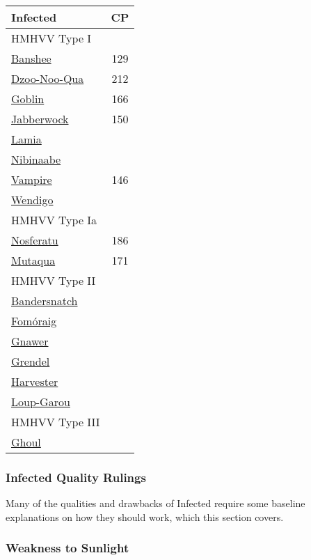 \begin{multicols*}{3}
	
	\begin{center}
		\begin{tabularx}{0.32\textwidth}{|X|c|}
			\hline
			Infected & CP \\
			\hline
			\hline
			HMHVV Type I & \\
			\hline
			\hyperref[banshee]{Banshee} & 129 \\
			\hyperref[dzoo-noo-qua]{Dzoo-Noo-Qua} & 212 \\
			\hyperref[goblin]{Goblin} & 166 \\
			\hyperref[jabberwock]{Jabberwock} & 150 \\
			\hyperref[lamia]{Lamia} & \\
			\hyperref[nibinaabe]{Nibinaabe} & \\
			\hyperref[vampire]{Vampire} & 146 \\
			\hyperref[wendigo]{Wendigo} & \\
			\hline
			\hline
			HMHVV Type Ia & \\
			\hline
			\hyperref[nosferatu]{Nosferatu} & 186 \\
			\hyperref[mutaqua]{Mutaqua} & 171 \\
			\hline
			\hline
			HMHVV Type II & \\
			\hline
			\hyperref[bandersnatch]{Bandersnatch} & \\
			\hyperref[formoraig]{Fomóraig} & \\
			\hyperref[gnawer]{Gnawer} & \\
			\hyperref[grendel]{Grendel} & \\
			\hyperref[harvester]{Harvester} & \\
			\hyperref[loup-garou]{Loup-Garou} & \\
			\hline
			\hline
			HMHVV Type III & \\
			\hline
			\hyperref[ghoul]{Ghoul} & \\
			\hline
		\end{tabularx}
	\end{center}
	
	\subsubsection{Infected Quality Rulings}
	
	Many of the qualities and drawbacks of Infected require some baseline explanations on how they should work, which this section covers.
	
	\subsubsection*{Weakness to Sunlight}
	

\end{multicols*}
